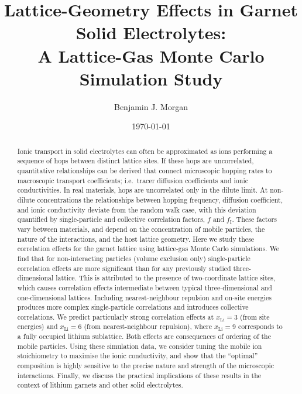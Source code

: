\documentclass[aps,prb,twocolumn,superscriptaddress,reprint]{revtex4-1}
\newcommand{\xLi}{x_\m{Li}}
\newcommand{\m}[1]{\mathrm{#1}}
\begin{document}
\title{Lattice-Geometry Effects in Garnet Solid Electrolytes:\\ A Lattice-Gas Monte Carlo Simulation Study}
\author{Benjamin J. Morgan}

\date{\today}

\begin{abstract}
Ionic transport in solid electrolytes can often be approximated as ions performing a sequence of hops between distinct lattice sites. If these hops are uncorrelated, quantitative relationships can be derived that connect microscopic hopping rates to macroscopic transport coefficients; i.e.\ tracer diffusion coefficients and ionic conductivities. In real materials, hops are uncorrelated only in the dilute limit. At non-dilute concentrations the relationships between hopping frequency, diffusion coefficient, and ionic conductivity deviate from the random walk case, with this deviation quantified by single-particle and collective correlation factors, $f$ and $f_\m{I}$. These factors vary between materials, and depend on the concentration of mobile particles, the nature of the interactions, and the host lattice geometry. 
Here we study these correlation effects for the garnet lattice using lattice-gas Monte Carlo simulations. We find that for non-interacting particles (volume exclusion only) single-particle correlation effects are more significant than for any previously studied three-dimensional lattice. This is attributed to the presence of two-coordinate lattice sites, which causes correlation effects intermediate between typical three-dimensional and one-dimensional lattices. Including nearest-neighbour repulsion and on-site energies produces more complex single-particle correlations and introduces collective correlations. We predict particularly strong correlation effects at $\xLi=3$ (from site energies) and $\xLi=6$ (from nearest-neighbour repulsion), where $\xLi=9$ corresponds to a fully occupied lithium sublattice. Both effects are consequences of ordering of the mobile particles. Using these simulation data, we consider tuning the mobile ion stoichiometry to maximise the ionic conductivity, and show that the ``optimal'' composition is highly sensitive to the precise nature and strength of the microscopic interactions.
Finally, we discuss the practical implications of these results in the context of lithium garnets and other solid electrolytes.
\end{abstract}

\maketitle
\end{document}

